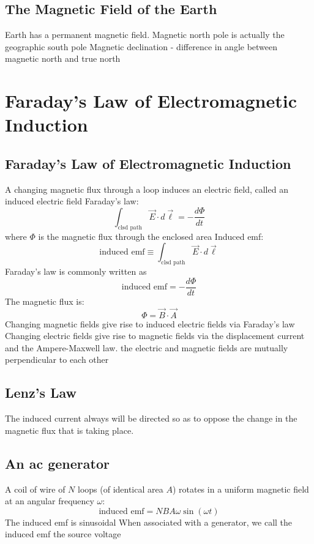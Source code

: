 \documentclass[twocolumn]{article}
\begin{document}
\subsection{The Magnetic Field of the Earth}
\begin{outline}
	\1 Earth has a permanent magnetic field. 
	\1 Magnetic north pole is actually the geographic south pole
	\1 Magnetic declination - difference in angle between magnetic north and true north
\end{outline}
\section{Faraday's Law of Electromagnetic Induction}
\subsection{Faraday's Law of Electromagnetic Induction}
\begin{outline}
	\1 A changing magnetic flux through a loop induces an electric field, called an induced electric field
	\1 Faraday's law: \[\int_{\text{clsd path}}\vec{E}\cdot d\vec{\ell}=-\dfrac{d\Phi}{dt}\] where $\Phi$ is the magnetic flux through the enclosed area 
	\1 Induced emf: \[\text{induced emf}\equiv\int_{\text{clsd path}}\vec{E}\cdot d\vec{\ell}\]
	\1 Faraday's law is commonly written as \[\text{induced emf}=-\dfrac{d\Phi}{dt}\]
	\1 The magnetic flux is: \[\Phi=\vec{B}\cdot\vec{A}\]
	\1 Changing magnetic fields give rise to induced electric fields via Faraday's law
	\1 Changing electric fields give rise to magnetic fields via the displacement current and the Ampere-Maxwell law.
	\1 the electric and magnetic fields are mutually perpendicular to each other
\end{outline}
\subsection{Lenz's Law}
\begin{outline}
	\1 The induced current always will be directed so as to oppose the change in the magnetic flux that is taking place. 
\end{outline}
\subsection{An ac generator}
\begin{outline}
	\1 A coil of wire of $N$ loops (of identical area $A$) rotates in a uniform magnetic field at an angular frequency $\omega$:\[\text{induced emf}=NBA\omega\sin(\omega t)\]
		\2 The induced emf is sinusoidal 
	\1 When associated with a generator, we call the induced emf the source voltage
\end{outline}
\end{document}
